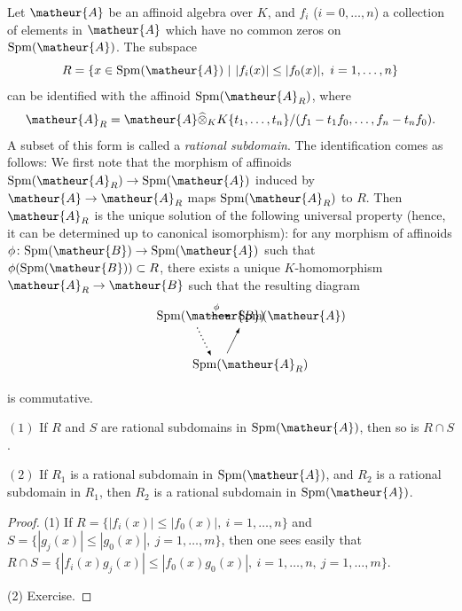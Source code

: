 Let $\matheur{A}$ be an affinoid algebra over $K$, and $f_i$ 
($i=0,\ldots,n$) a collection of elements in $\matheur{A}$ which have no
common zeros on $\mathrm{Spm}(\matheur{A})$. 
The subspace
\begin{equation*}
 R=\{x\in\mathrm{Spm}(\matheur{A})\ |\ |f_i(x)|\leq |f_0(x)|,\ i=1,\ldots,n\}
\end{equation*}
can be identified with the affinoid $\mathrm{Spm}(\matheur{A}_R)$, where
\begin{equation*}
 \matheur{A}_R=\matheur{A}\widehat{\otimes}_KK\{t_1,\ldots,t_n\}/
 (f_1-t_1f_0,\ldots,f_n-t_nf_0).
\end{equation*}
A subset of this form is called a {\it rational subdomain}.
The identification comes as follows:
We first note that the morphism of affinoids $\mathrm{Spm}(\matheur{A}_R)
\rightarrow\mathrm{Spm}(\matheur{A})$ induced by
$\matheur{A}\rightarrow\matheur{A}_R$ maps $\mathrm{Spm}(\matheur{A}_R)$ to 
$R$.
Then $\matheur{A}_R$ is the unique solution of the following 
universal property (hence, it can be determined up to canonical isomorphism):
for any morphism of affinoids
$\phi\colon\mathrm{Spm}(\matheur{B})\rightarrow\mathrm{Spm}(\matheur{A})$ such
that $\phi(\mathrm{Spm}(\matheur{B}))\subset R$, there exists a unique 
$K$-homomorphism $\matheur{A}_R\rightarrow\matheur{B}$ such that
the resulting diagram
\vspace{1.5ex}
$$
\setlength{\unitlength}{1pt}
\begin{picture}(100,60)(10,0)
\put(0,45){$\mathrm{Spm}(\matheur{B})$}
\put(40,48){\vector(1,0){20}}
\put(46,53){$\scriptstyle{\phi}$}
\put(66,45){$\mathrm{Spm}(\matheur{A})$}
\put(29,6){$\mathrm{Spm}(\matheur{A}_R)$}
\multiput(33,38)(1.5,-3){6}{\circle*{.3}}\put(42,20){\vector(1,-2){2}}
\put(57,18){\vector(1,2){10}}
\end{picture}\vspace{-1ex}
$$
is commutative.

\begin{applem}\label{lem-rational-intersection}

$\mathrm{(1)}$
If $R$ and $S$ are rational subdomains in $\mathrm{Spm}(\matheur{A})$, then 
so is $R\cap S$.

$\mathrm{(2)}$
If $R_1$ is a rational subdomain in $\mathrm{Spm}(\matheur{A})$, and $R_2$ 
is a rational subdomain in $R_1$, then $R_2$ is a rational subdomain 
in $\mathrm{Spm}(\matheur{A})$.
\end{applem}

\begin{proof}
(1)
If $R=\{|f_i(x)|\leq |f_0(x)|,\ i=1,\ldots,n\}$ and
$S=\{|g_j(x)|\leq |g_0(x)|,\ j=1,\ldots,m\}$, then
one sees easily that 
$R\cap S=\{|f_i(x)g_j(x)|\leq |f_0(x)g_0(x)|,\ i=1,\ldots,n,
\ j=1,\ldots,m\}$.

(2) Exercise.
\end{proof}


